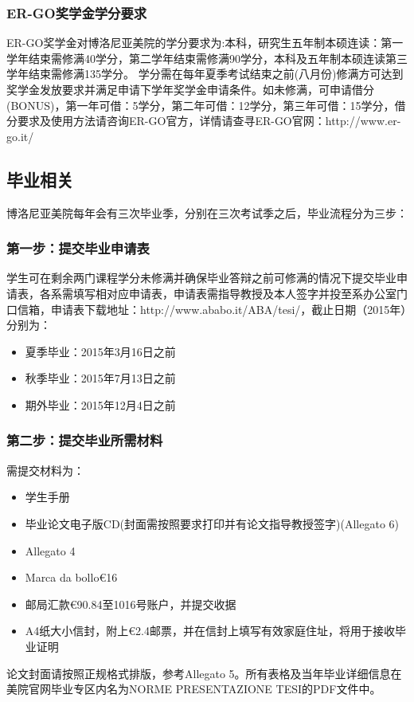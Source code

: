 \subsubsection{ER-GO奖学金学分要求}
ER-GO奖学金对博洛尼亚美院的学分要求为:本科，研究生五年制本硕连读：第一学年结束需修满40学分，第二学年结束需修满90学分，本科及五年制本硕连读第三学年结束需修满135学分。
学分需在每年夏季考试结束之前(八月份)修满方可达到奖学金发放要求并满足申请下学年奖学金申请条件。如未修满，可申请借分(BONUS)，第一年可借：5学分，第二年可借：12学分，第三年可借：15学分，借分要求及使用方法请咨询ER-GO官方，详情请查寻ER-GO官网：http://www.er-go.it/


\subsection{毕业相关}
博洛尼亚美院每年会有三次毕业季，分别在三次考试季之后，毕业流程分为三步：

\subsubsection{第一步：提交毕业申请表}
学生可在剩余两门课程学分未修满并确保毕业答辩之前可修满的情况下提交毕业申请表，各系需填写相对应申请表，申请表需指导教授及本人签字并投至系办公室门口信箱，申请表下载地址：http://www.ababo.it/ABA/tesi/，截止日期（2015年）分别为：

\begin{itemize}
  \item 夏季毕业：2015年3月16日之前
  \item 秋季毕业：2015年7月13日之前
  \item 期外毕业：2015年12月4日之前
\end{itemize}

\subsubsection{第二步：提交毕业所需材料}
需提交材料为：
\begin{itemize}
  \item 学生手册
  \item 毕业论文电子版CD(封面需按照要求打印并有论文指导教授签字)(Allegato 6)
  \item Allegato 4
  \item Marca da bollo€16
  \item 邮局汇款€90.84至1016号账户，并提交收据
  \item A4纸大小信封，附上€2.4邮票，并在信封上填写有效家庭住址，将用于接收毕业证明
\end{itemize}
论文封面请按照正规格式排版，参考Allegato 5。所有表格及当年毕业详细信息在美院官网毕业专区内名为NORME PRESENTAZIONE TESI的PDF文件中。


